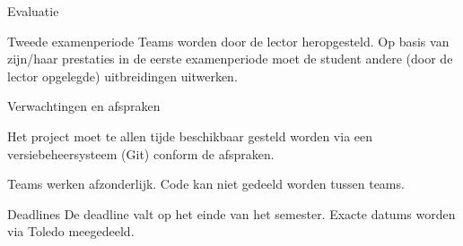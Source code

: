 \documentclass{studiewijzer}
\begin{document}
\begin{categorybox}{Evaluatie}
    \begin{category}{Tweede examenperiode}
        Teams worden door de lector heropgesteld.
        Op basis van zijn/haar prestaties in de eerste examenperiode moet de student andere (door de lector opgelegde) uitbreidingen uitwerken.
    \end{category}

    \begin{category}{Verwachtingen en afspraken}
        \begin{items}
            \item Het project moet te allen tijde beschikbaar gesteld worden via een versiebeheersysteem (Git) conform de afspraken.
            \item Teams werken afzonderlijk. Code kan niet gedeeld worden tussen teams.
        \end{items}
    \end{category}

    \begin{category}{Deadlines}
            De deadline valt op het einde van het semester. Exacte datums worden via Toledo meegedeeld.
    \end{category}
\end{categorybox}
\end{document}
